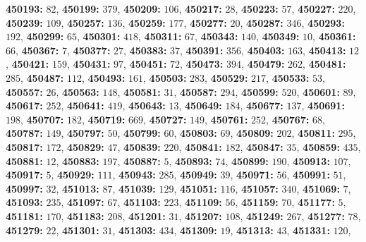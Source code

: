 \textsf{\bfseries 450193:} $82$, \textsf{\bfseries 450199:} $379$, \textsf{\bfseries 450209:} $106$, \textsf{\bfseries 450217:} $28$, \textsf{\bfseries 450223:} $57$, \textsf{\bfseries 450227:} $220$, \textsf{\bfseries 450239:} $109$, \textsf{\bfseries 450257:} $136$, \textsf{\bfseries 450259:} $177$, \textsf{\bfseries 450277:} $20$, \textsf{\bfseries 450287:} $346$, \textsf{\bfseries 450293:} $192$, \textsf{\bfseries 450299:} $65$, \textsf{\bfseries 450301:} $418$, \textsf{\bfseries 450311:} $67$, \textsf{\bfseries 450343:} $140$, \textsf{\bfseries 450349:} $10$, \textsf{\bfseries 450361:} $66$, \textsf{\bfseries 450367:} $7$, \textsf{\bfseries 450377:} $27$, \textsf{\bfseries 450383:} $37$, \textsf{\bfseries 450391:} $356$, \textsf{\bfseries 450403:} $163$, \textsf{\bfseries 450413:} $12$, \textsf{\bfseries 450421:} $159$, \textsf{\bfseries 450431:} $97$, \textsf{\bfseries 450451:} $72$, \textsf{\bfseries 450473:} $394$, \textsf{\bfseries 450479:} $262$, \textsf{\bfseries 450481:} $285$, \textsf{\bfseries 450487:} $112$, \textsf{\bfseries 450493:} $161$, \textsf{\bfseries 450503:} $283$, \textsf{\bfseries 450529:} $217$, \textsf{\bfseries 450533:} $53$, \textsf{\bfseries 450557:} $26$, \textsf{\bfseries 450563:} $148$, \textsf{\bfseries 450581:} $31$, \textsf{\bfseries 450587:} $294$, \textsf{\bfseries 450599:} $520$, \textsf{\bfseries 450601:} $89$, \textsf{\bfseries 450617:} $252$, \textsf{\bfseries 450641:} $419$, \textsf{\bfseries 450643:} $13$, \textsf{\bfseries 450649:} $184$, \textsf{\bfseries 450677:} $137$, \textsf{\bfseries 450691:} $198$, \textsf{\bfseries 450707:} $182$, \textsf{\bfseries 450719:} $669$, \textsf{\bfseries 450727:} $149$, \textsf{\bfseries 450761:} $252$, \textsf{\bfseries 450767:} $68$, \textsf{\bfseries 450787:} $149$, \textsf{\bfseries 450797:} $50$, \textsf{\bfseries 450799:} $60$, \textsf{\bfseries 450803:} $69$, \textsf{\bfseries 450809:} $202$, \textsf{\bfseries 450811:} $295$, \textsf{\bfseries 450817:} $172$, \textsf{\bfseries 450829:} $47$, \textsf{\bfseries 450839:} $220$, \textsf{\bfseries 450841:} $182$, \textsf{\bfseries 450847:} $35$, \textsf{\bfseries 450859:} $435$, \textsf{\bfseries 450881:} $12$, \textsf{\bfseries 450883:} $197$, \textsf{\bfseries 450887:} $5$, \textsf{\bfseries 450893:} $74$, \textsf{\bfseries 450899:} $190$, \textsf{\bfseries 450913:} $107$, \textsf{\bfseries 450917:} $5$, \textsf{\bfseries 450929:} $111$, \textsf{\bfseries 450943:} $285$, \textsf{\bfseries 450949:} $39$, \textsf{\bfseries 450971:} $56$, \textsf{\bfseries 450991:} $51$, \textsf{\bfseries 450997:} $32$, \textsf{\bfseries 451013:} $87$, \textsf{\bfseries 451039:} $129$, \textsf{\bfseries 451051:} $116$, \textsf{\bfseries 451057:} $340$, \textsf{\bfseries 451069:} $7$, \textsf{\bfseries 451093:} $235$, \textsf{\bfseries 451097:} $67$, \textsf{\bfseries 451103:} $223$, \textsf{\bfseries 451109:} $56$, \textsf{\bfseries 451159:} $70$, \textsf{\bfseries 451177:} $5$, \textsf{\bfseries 451181:} $170$, \textsf{\bfseries 451183:} $208$, \textsf{\bfseries 451201:} $31$, \textsf{\bfseries 451207:} $108$, \textsf{\bfseries 451249:} $267$, \textsf{\bfseries 451277:} $78$, \textsf{\bfseries 451279:} $22$, \textsf{\bfseries 451301:} $31$, \textsf{\bfseries 451303:} $434$, \textsf{\bfseries 451309:} $19$, \textsf{\bfseries 451313:} $43$, \textsf{\bfseries 451331:} $120$, 
